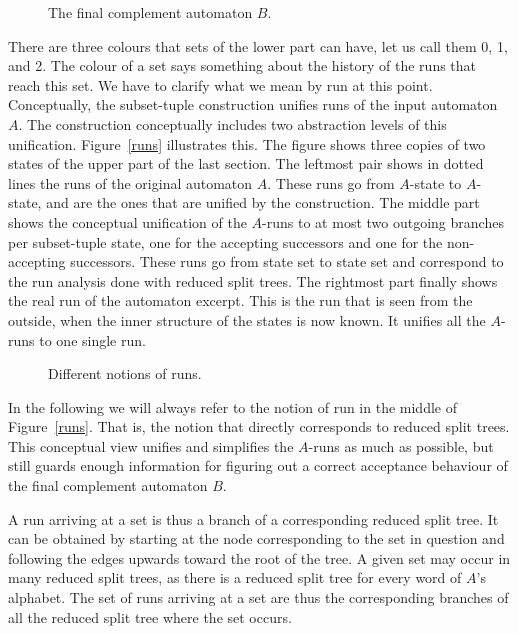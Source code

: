 \begin{figure}
\begin{center}
\Complement
\caption{The final complement automaton $B$.}
\label{complement}
\end{center}
\end{figure} 

There are three colours that sets of the lower part can have, let us call them 0, 1, and 2. The colour of a set says something about the history of the runs that reach this set. We have to clarify what we mean by run at this point. Conceptually, the subset-tuple construction unifies runs of the input automaton $A$. The construction conceptually includes two abstraction levels of this unification. Figure~\ref{runs} illustrates this. The figure shows three copies of two states of the upper part of the last section. The leftmost pair shows in dotted lines the runs of the original automaton $A$. These runs go from $A$-state to $A$-state, and are the ones that are unified by the construction. The middle part shows the conceptual unification of the $A$-runs to at most two outgoing branches per subset-tuple state, one for the accepting successors and one for the non-accepting successors. These runs go from state set to state set and correspond to the run analysis done with reduced split trees. The rightmost part finally shows the real run of the automaton excerpt. This is the run that is seen from the outside, when the inner structure of the states is now known. It unifies all the $A$-runs to one single run.

\begin{figure}
\begin{center}
\RunTypes
\caption{Different notions of runs.}
\label{run_types}
\end{center}
\end{figure} 

In the following we will always refer to the notion of run in the middle of Figure~\ref{runs}. That is, the notion that directly corresponds to reduced split trees. This conceptual view unifies and simplifies the $A$-runs as much as possible, but still guards enough information for figuring out a correct acceptance behaviour of the final complement automaton $B$.

A run arriving at a set is thus a branch of a corresponding reduced split tree. It can be obtained by starting at the node corresponding to the set in question and following the edges upwards toward the root of the tree. A given set may occur in many reduced split trees, as there is a reduced split tree for every word of $A$'s alphabet. The set of runs arriving at a set are thus the corresponding branches of all the reduced split tree where the set occurs.

